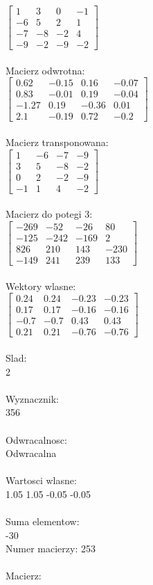 \documentclass[a4paper,12pt]{article}
\begin{document}
$\begin{bmatrix} 1&3&0&-1\\-6&5&2&1\\-7&-8&-2&4\\-9&-2&-9&-2 \end{bmatrix}$
\\
\\
Macierz odwrotna:\\

$\begin{bmatrix} 0.62&-0.15&0.16&-0.07\\0.83&-0.01&0.19&-0.04\\-1.27&0.19&-0.36&0.01\\2.1&-0.19&0.72&-0.2 \end{bmatrix}$
\\
\\
Macierz transponowana:\\

$\begin{bmatrix} 1&-6&-7&-9\\3&5&-8&-2\\0&2&-2&-9\\-1&1&4&-2 \end{bmatrix}$
\\
\\
Macierz do potegi 3:\\

$\begin{bmatrix} -269&-52&-26&80\\-125&-242&-169&2\\826&210&143&-230\\-149&241&239&133 \end{bmatrix}$
\\
\\
Wektory wlasne:\\

$\begin{bmatrix} 0.24&0.24&-0.23&-0.23\\0.17&0.17&-0.16&-0.16\\-0.7&-0.7&0.43&0.43\\0.21&0.21&-0.76&-0.76 \end{bmatrix}$
\\
\\
Slad:\\
2
\\
\\
Wyznacznik:\\
356
\\
\\
Odwracalnosc:\\
Odwracalna
\\
\\
Wartosci wlasne:\\
1.05 1.05 -0.05 -0.05
\\
\\
Suma elementow:\\
-30
\\
\newpage
Numer macierzy:
253
\\
\\
Macierz:\\
\end{document}
